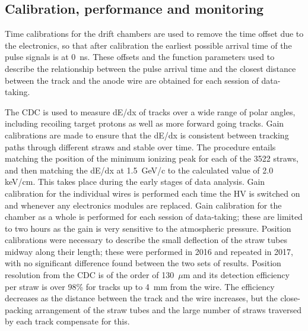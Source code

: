 \subsection{Calibration, performance and monitoring \label{sec:dccalib}}
Time calibrations for the drift chambers are used to remove the time offset due to the electronics, so that after calibration the earliest possible arrival time of the pulse signals is at 0~ns. These offsets and the function parameters used to describe the relationship between the pulse arrival time and the closest distance between the track and the anode wire are obtained for each session of data-taking. 

The CDC is used to measure dE/dx of tracks over a wide range of polar angles, including recoiling target protons as well as more forward going tracks. Gain calibrations are made to ensure that the dE/dx is consistent between tracking paths through different straws and stable over time. 
The procedure entails matching the position of the minimum ionizing peak for each of the 3522 straws, and then matching the dE/dx at 1.5~GeV/c to the calculated value of 2.0~ keV/cm. This takes place during the early stages of data analysis. Gain calibration for the individual wires is performed each time the HV is switched on and whenever any electronics modules are replaced. Gain calibration for the chamber as a whole is performed for each session of data-taking; these are limited to two hours as the gain is very sensitive to the atmospheric pressure. Position calibrations were necessary to describe the small deflection of the straw tubes midway along their length; these were performed in 2016 and repeated in 2017, with no significant difference found between the two sets of results.  Position resolution from the CDC is of the order of 130~$\mu$m and its detection efficiency per straw is over 98\% for tracks up to 4~mm from the wire. The efficiency decreases as the distance between the track and the wire increases, but the close-packing arrangement of the straw tubes and the large number of straws traversed by each track compensate for this. 

